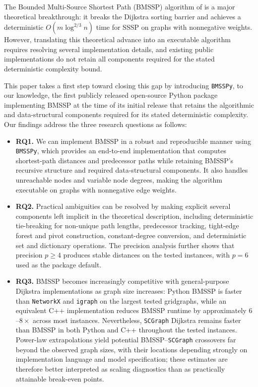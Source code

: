 \documentclass[ijoc,blindrev]{informs3} %
\begin{document}
The Bounded Multi-Source Shortest Path (BMSSP) algorithm of \citet{duan_breaking_2025} is a major theoretical breakthrough: it breaks the Dijkstra sorting barrier and achieves a deterministic \(O(m\log^{2/3} n)\) time for SSSP on graphs with nonnegative weights. However, {\color{blue}translating this theoretical advance into an executable algorithm requires resolving several implementation details, and existing public implementations do not retain all components required for the stated deterministic complexity bound.}

{\color{blue}
This paper takes a first step toward closing this gap by introducing \texttt{BMSSPy}, to our knowledge, the first publicly released open-source Python package implementing BMSSP at the time of its initial release that retains the algorithmic and data-structural components required for its stated deterministic complexity. Our findings address the three research questions as follows:
}

\begin{itemize}

\item {\color{blue}
\textbf{RQ1.} We can implement BMSSP in a robust and reproducible manner using \texttt{BMSSPy}, which provides an end-to-end implementation that computes shortest-path distances and predecessor paths while retaining BMSSP's recursive structure and required data-structural components. It also handles unreachable nodes and variable node degrees, making the algorithm executable on graphs with nonnegative edge weights.
}

\item {\color{blue}
\textbf{RQ2.} Practical ambiguities can be resolved by making explicit several components left implicit in the theoretical description, including deterministic tie-breaking for non-unique path lengths, predecessor tracking, tight-edge forest and pivot construction, constant-degree conversion, and deterministic set and dictionary operations. The precision analysis further shows that precision \(p\geq4\) produces stable distances on the tested instances, with \(p=6\) used as the package default.
}

\item {\color{blue}
\textbf{RQ3.} BMSSP becomes increasingly competitive with general-purpose Dijkstra implementations as graph size increases: Python BMSSP is faster than \texttt{NetworkX} and \texttt{igraph} on the largest tested gridgraphs, while an equivalent C++ implementation reduces BMSSP runtime by approximately \(6\)--\(8\times\) across most instances. Nevertheless, \texttt{SCGraph} Dijkstra remains faster than BMSSP in both Python and C++ throughout the tested instances. Power-law extrapolations yield potential BMSSP--\texttt{SCGraph} crossovers far beyond the observed graph sizes, with their locations depending strongly on implementation language and model specification; these estimates are therefore better interpreted as scaling diagnostics than as practically attainable break-even points.
}

\end{itemize}
\end{document}
